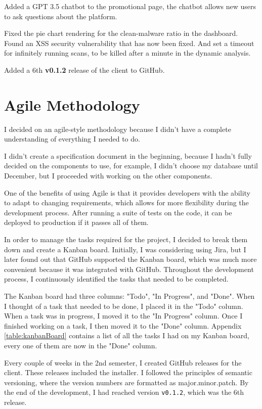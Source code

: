 Added a GPT 3.5 chatbot to the promotional page,
the chatbot allows new users to ask questions about the platform.

Fixed the pie chart rendering for the clean-malware ratio in the dashboard.
Found an XSS security vulnerability that has now been fixed.
And set a timeout for infinitely running scans,
to be killed after a minute in the dynamic analysis.

Added a 6th \textbf{v0.1.2} release of the client to GitHub.

\section{Agile Methodology}
I decided on an agile-style methodology because
I didn't have a complete understanding of everything I needed to do.

I didn't create a specification document in the beginning,
because I hadn't fully decided on the components to use,
for example, I didn't choose my database until December,
but I proceeded with working on the other components.

One of the benefits of using Agile is that it provides developers
with the ability to adapt to changing requirements,
which allows for more flexibility during the development process.
After running a suite of tests on the code,
it can be deployed to production if it passes all of them.

In order to manage the tasks required for the project,
I decided to break them down and create a Kanban board.
Initially, I was considering using Jira, but I later found out that
GitHub supported the Kanban board,
which was much more convenient because it was integrated with GitHub.
Throughout the development process,
I continuously identified the tasks that needed to be completed.

The Kanban board had three columns: "Todo", "In Progress", and "Done".
When I thought of a task that needed to be done, I placed it in the "Todo" column.
When a task was in progress, I moved it to the "In Progress" column.
Once I finished working on a task, I then moved it to the "Done" column.
Appendix \ref{table:kanbanBoard} contains a list of
all the tasks I had on my Kanban board,
every one of them are now in the "Done" column.

Every couple of weeks in the 2nd semester,
I created GitHub releases for the client.
These releases included the installer.
I followed the principles of semantic versioning,
where the version numbers are formatted as major.minor.patch.
By the end of the development,
I had reached version \texttt{v0.1.2}, which was the 6th release.

